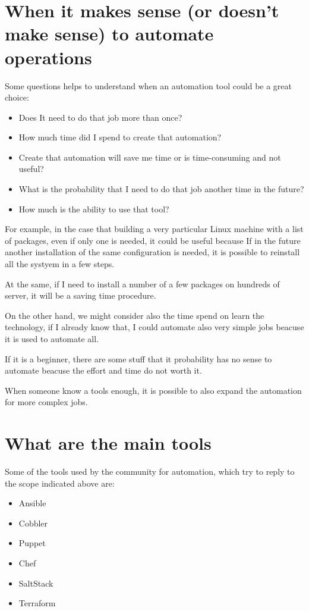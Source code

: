 \documentclass[12pt,a4paper,openright,twoside]{book}
\begin{document}
\section{When it makes sense (or doesn't make sense) to automate operations}
Some questions helps to understand when an automation tool could be a great choice:
\begin{itemize}
    \item Does It need to do that job more than once?
    \item How much time did I spend to create that automation?
    \item Create that automation will save me time or is time-consuming and not useful?
    \item What is the probability that I need to do that job another time in the future?
    \item How much is the ability to use that tool?
\end{itemize}

For example, in the case that building a very particular Linux machine with a list of packages, even if only one is needed, it could be useful because If in the future another installation of the same configuration is needed, it is possible to reinstall all the systyem in a few steps.


At the same, if I need to install a number of a few packages on hundreds of server, it will be a saving time procedure.


On the other hand, we might consider also the time spend on learn the technology, if I already know that, I could automate also very simple jobs beacuse it is used to automate all.


If it is a beginner, there are some stuff that it probability has no sense to automate beacuse the effort and time do not worth it.


When someone know a tools enough, it is possible to also expand the automation for more complex jobs.

\section{What are the main tools}
Some of the tools used by the community for automation, which try to reply to the scope indicated above are:

\begin{itemize}
    \item Ansible
    \item Cobbler
    \item Puppet
    \item Chef
    \item SaltStack
    \item Terraform
\end{itemize}
\end{document}
